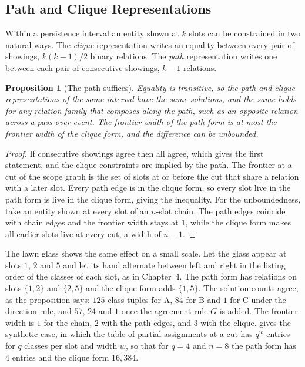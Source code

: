 \documentclass[11pt,twoside,openright]{book}
\theoremstyle{plain}
\newtheorem{proposition}[theorem]{Proposition}
\theoremstyle{definition}
\theoremstyle{remark}
\begin{document}
\subsection{Path and Clique Representations}

Within a persistence interval an entity shown at $k$ slots can be constrained in two natural ways. The \emph{clique} representation writes an equality between every pair of showings, $k(k-1)/2$ binary relations. The \emph{path} representation writes one between each pair of consecutive showings, $k-1$ relations.

\begin{proposition}[The path suffices]\label{prop:path}
Equality is transitive, so the path and clique representations of the same interval have the same solutions, and the same holds for any relation family that composes along the path, such as an opposite relation across a pass-over event. The frontier width of the path form is at most the frontier width of the clique form, and the difference can be unbounded.
\end{proposition}

\begin{proof}
If consecutive showings agree then all agree, which gives the first statement, and the clique constraints are implied by the path. The frontier at a cut of the scope graph is the set of slots at or before the cut that share a relation with a later slot. Every path edge is in the clique form, so every slot live in the path form is live in the clique form, giving the inequality. For the unboundedness, take an entity shown at every slot of an $n$-slot chain. The path edges coincide with chain edges and the frontier width stays at $1$, while the clique form makes all earlier slots live at every cut, a width of $n-1$.
\end{proof}

The lawn glass shows the same effect on a small scale. Let the glass appear at slots $1$, $2$ and $5$ and let its hand alternate between left and right in the listing order of the classes of each slot, as in Chapter~4. The path form has relations on slots $\{1,2\}$ and $\{2,5\}$ and the clique form adds $\{1,5\}$. The solution counts agree, as the proposition says: $125$ class tuples for A, $84$ for B and $1$ for C under the direction rule, and $57$, $24$ and $1$ once the agreement rule $G$ is added. The frontier width is $1$ for the chain, $2$ with the path edges, and $3$ with the clique.  gives the synthetic case, in which the table of partial assignments at a cut has $q^{w}$ entries for $q$ classes per slot and width $w$, so that for $q=4$ and $n=8$ the path form has $4$ entries and the clique form $16{,}384$.
\end{document}
